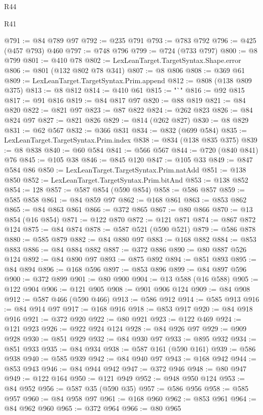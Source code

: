 \begin{lexlean}{R44}
\begin{lexlean}{R41}
\begin{coremodule}
{{{{{{{{{{{{{{{{{{{{{{{{{{{{{{{{{{{{{{{{{{{{{{{{{{{{{{{{{{{{{{{{{{{{{{{{{{{{{{{{{{{{{{{@791 := @84 @789 @97
@792 := @235 @791
@793 := @783 @792
@796 := @425 (@457 @793) @460
@797 := @748 @796
@799 := @724 (@733 @797)
@800 := @8 @799
@801 := @410 @78
@802 := LexLeanTarget.TargetSyntax.Shape.error
@806 := @801 (@132 @802 @78 @341)
@807 := @8 @806
@808 := @369 @61
@809 := LexLeanTarget.TargetSyntax.Prim.append
@812 := @808 (@138 @809 @375)
@813 := @8 @812
@814 := @410 @61
@815 := "`"
@816 := @92 @815
@817 := @91 @816
@819 := @84 @817 @97
@820 := @88 @819
@821 := @84 @820
@822 := @821 @97
@823 := @87 @822
@824 := @262 @823
@826 := @84 @824 @97
@827 := @821 @826
@829 := @814 (@262 @827)
@830 := @8 @829
@831 := @62 @567
@832 := @366 @831
@834 := @832 (@699 @584)
@835 := LexLeanTarget.TargetSyntax.Prim.index
@838 := @834 (@138 @835 @375)
@839 := @8 @838
@840 := @60 @584
@841 := @566 @567
@844 := @720 (@840 @841) @76
@845 := @105 @38
@846 := @845 @120
@847 := @105 @33
@849 := @847 @584 @86
@850 := LexLeanTarget.TargetSyntax.Prim.natAdd
@851 := @138 @850
@852 := LexLeanTarget.TargetSyntax.Prim.bitAnd
@853 := @138 @852
@854 := 128
@857 := @587 @854 (@590 @854)
@858 := @586 @857
@859 := @585 @858
@861 := @84 @859 @97
@862 := @168 @861
@863 := @853 @862
@865 := @84 @863 @861
@866 := @372 @865
@867 := @80 @866
@870 := @13 @854 (@16 @854)
@871 := @122 @870
@872 := @121 @871
@874 := @867 @872 @124
@875 := @84 @874
@878 := @587 @521 (@590 @521)
@879 := @586 @878
@880 := @585 @879
@882 := @84 @880 @97
@883 := @168 @882
@884 := @853 @883
@886 := @84 @884 @882
@887 := @372 @886
@890 := @80 @887 @526 @124
@892 := @84 @890 @97
@893 := @875 @892
@894 := @851 @893
@895 := @84 @894
@896 := @168 @596
@897 := @853 @896
@899 := @84 @897 @596
@900 := @372 @899
@901 := @80 @900
@904 := @13 @588 (@16 @588)
@905 := @122 @904
@906 := @121 @905
@908 := @901 @906 @124
@909 := @84 @908
@912 := @587 @466 (@590 @466)
@913 := @586 @912
@914 := @585 @913
@916 := @84 @914 @97
@917 := @168 @916
@918 := @853 @917
@920 := @84 @918 @916
@921 := @372 @920
@922 := @80 @921
@923 := @122 @469
@924 := @121 @923
@926 := @922 @924 @124
@928 := @84 @926 @97
@929 := @909 @928
@930 := @851 @929
@932 := @84 @930 @97
@933 := @895 @932
@934 := @851 @933
@935 := @84 @934
@938 := @587 @161 (@590 @161)
@939 := @586 @938
@940 := @585 @939
@942 := @84 @940 @97
@943 := @168 @942
@944 := @853 @943
@946 := @84 @944 @942
@947 := @372 @946
@948 := @80 @947
@949 := @122 @164
@950 := @121 @949
@952 := @948 @950 @124
@953 := @84 @952
@956 := @587 @35 (@590 @35)
@957 := @586 @956
@958 := @585 @957
@960 := @84 @958 @97
@961 := @168 @960
@962 := @853 @961
@964 := @84 @962 @960
@965 := @372 @964
@966 := @80 @965
}}}}}}}}}}}}}}}}}}}}}}}}}}}}}}}}}}}}}}}}}}}}}}}}}}}}}}}}}}}}}}}}}}}}}}}}}}}}}}}}}}}}}}}
\end{coremodule}
\end{lexlean}
\end{lexlean}
